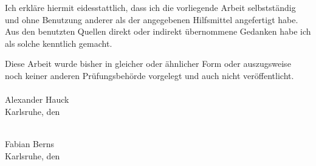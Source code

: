 Ich erkläre hiermit eidesstattlich, dass ich die vorliegende Arbeit selbstständig und ohne Benutzung anderer als der angegebenen Hilfsmittel angefertigt habe.
Aus den benutzten Quellen direkt oder indirekt übernommene Gedanken habe ich als solche kenntlich gemacht.

Diese Arbeit wurde bisher in gleicher oder ähnlicher Form oder auszugsweise noch keiner anderen Prüfungsbehörde vorgelegt und auch nicht veröffentlicht.
\\
\vspace{2cm}
\\
\noindent Alexander Hauck
\\
\noindent Karlsruhe, den \underline{\hspace{4cm}}

\leavevmode
\vspace{2cm}
\\
\noindent Fabian Berns
\\
\noindent Karlsruhe, den \underline{\hspace{4cm}}